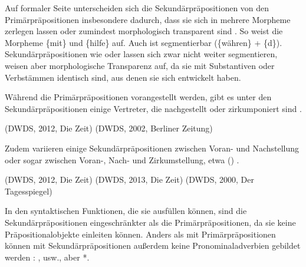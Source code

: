 Auf formaler Seite unterscheiden sich die Sekundärpräpositionen von den Primärpräpositionen insbesondere dadurch, dass sie sich in mehrere Morpheme zerlegen lassen oder zumindest morphologisch transparent sind \citep[s.][62]{DiMeola2001}. 
So weist  die Morpheme \{mit\} und \{hilfe\} auf. 
Auch  ist segmentierbar (\{währen\} + \{d\}). 
Sekundärpräpositionen wie  oder  lassen sich zwar nicht weiter segmentieren, weisen aber morphologische Transparenz auf, da sie mit Substantiven oder Verbstämmen identisch sind, aus denen sie sich entwickelt haben. 

Während die Primärpräpositionen vorangestellt werden, gibt es unter den Sekundärpräpositionen einige Vertreter, die nachgestellt oder zirkumponiert sind \citep[s.][152]{DiMeola2000}.
\begin{exe}
\ex {} (DWDS, 2012, Die Zeit)
\ex {} (DWDS, 2002, Berliner Zeitung)
\end{exe}
Zudem variieren einige Sekundärpräpositionen zwischen Voran- und Nachstellung oder sogar zwischen Voran-, Nach- und Zirkumstellung, etwa () . 
\begin{exe}
\sloppy
\ex {} (DWDS, 2012, Die Zeit)
\ex {} (DWDS, 2013, Die Zeit) 
\ex {} (DWDS, 2000, Der Tagesspiegel)
\end{exe}
In den syntaktischen Funktionen, die sie ausfüllen können, sind die Sekundärpräpositionen eingeschränkter als die Primärpräpositionen, da sie keine Präpositionalobjekte einleiten können. 
Anders als mit Primärpräpositionen können mit Sekundärpräpositionen außerdem keine Pronominaladverbien gebildet werden \citep[s.][526]{Eisenberg1979}:
,  usw., aber *.

